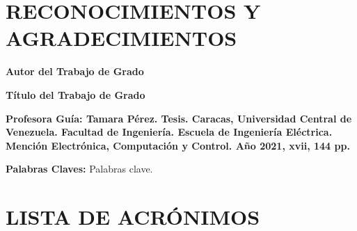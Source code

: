 \documentclass[letterpaper,titlepage,12pt,oneside,spanish,final]{report_eie}
\numberwithin{equation}{chapter}%
\numberwithin{figure}{chapter}%
\numberwithin{table}{chapter}%
\numberwithin{definition}{chapter}%
\numberwithin{lemma}{chapter}%
\numberwithin{theorem}{chapter}%
\numberwithin{corollary}{chapter}%
\numberwithin{condition}{chapter}%
\numberwithin{criterion}{chapter}%
\numberwithin{problem}{chapter}%
\numberwithin{property}{chapter}%
\numberwithin{proposition}{chapter}%
\numberwithin{solution}{chapter}%
\numberwithin{conjecture}{chapter}%
\begin{document}
\chapter*{RECONOCIMIENTOS Y AGRADECIMIENTOS}
%
\newpage
\renewcommand*{\abstract}{\begin{center}\end{center}}
\begin{spacing}{1}
\begin{center}%

\textbf{Autor del Trabajo de Grado}

\begin{large}
\textbf{Título del Trabajo de Grado}
\end{large}
\end{center}

\textbf{Profesora Guía: Tamara Pérez. Tesis.
Caracas, Universidad Central de Venezuela. Facultad de Ingeniería.
Escuela de Ingeniería Eléctrica. Mención Electrónica, Computación y Control. Año 2021,
xvii, 144 pp.}

\textbf{Palabras Claves:} Palabras clave. \\[1ex]


\end{spacing}

%
\thispagestyle{empty}%
\newpage
\addtocounter{page}{3}%
\setlength{\parskip}{3pt}%
\tableofcontents%
\listoffigures%
\listoftables%

\newpage

\chapter*{LISTA DE ACRÓNIMOS}%
%
%

\justifying
\end{document}
